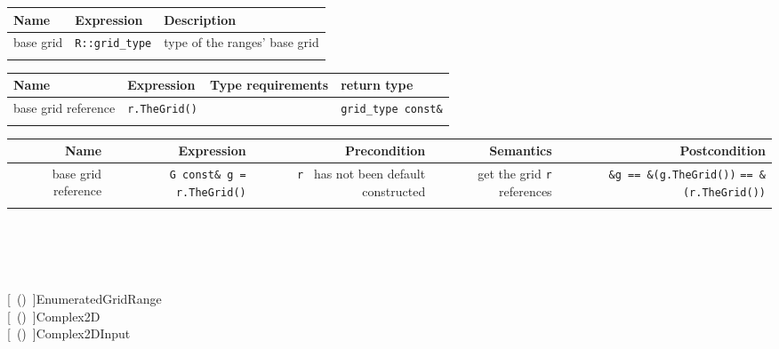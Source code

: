     \begin{tabular}{lll} \\
      \hline
      \bf  Name  &\bf  Expression  &\bf  Description   \\ 
      \hline
      base grid &
      {\tt  R::grid\_type}  &
      type of the  ranges' base grid 
      \\ 
      \hline
      \\
    \end{tabular}
 

   \begin{tabular}{llll} \\
     \hline
       \bf  Name  &\bf  Expression  &\bf  Type requirements  & \bf  return type  \\ 
       \hline
       base grid reference  &
       {\tt  r.TheGrid()}  &
       & 
       {\tt  grid\_type const\&}  \\ 
       \hline
       \\
    \end{tabular}

   
    \begin{tabularx}{14cm}{RRRRR} \\
      \hline
      \bf  Name       &
      \bf  Expression &
      \bf  Precondition&
      \bf   Semantics &
      \bf   Postcondition
      \\
      \hline
      base grid   reference  &
      {\tt G const\&  g = r.TheGrid()}  &
      {\tt r } has not been default constructed &
      get the grid {\tt  r} references  &
      {\tt  \&g == \&(g.TheGrid())} {\tt == \&(r.TheGrid())}  \\ 
    \hline
    \\
  \end{tabularx}

  \W{}

     ~
    \W\\
     ~
    \W\\
     ~
    \W\\
     ~
    \W\\
    
    [~(\Ref)~]{EnumeratedGridRange} ~
    \W\\
    [~(\Ref)~]{Complex2D} ~
    \W\\
    [~(\Ref)~]{Complex2DInput} ~

